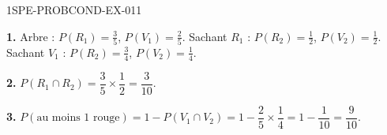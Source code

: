 \begin{corrige}{1SPE-PROBCOND-EX-011}

\textbf{1.} Arbre : $P(R_1) = \frac{3}{5}$, $P(V_1) = \frac{2}{5}$. Sachant $R_1$ : $P(R_2) = \frac{1}{2}$, $P(V_2) = \frac{1}{2}$. Sachant $V_1$ : $P(R_2) = \frac{3}{4}$, $P(V_2) = \frac{1}{4}$.

\medskip
\textbf{2.} $P(R_1 \cap R_2) = \dfrac{3}{5} \times \dfrac{1}{2} = \dfrac{3}{10}$.

\medskip
\textbf{3.} $P(\text{au moins 1 rouge}) = 1 - P(V_1 \cap V_2) = 1 - \dfrac{2}{5} \times \dfrac{1}{4} = 1 - \dfrac{1}{10} = \dfrac{9}{10}$.

\end{corrige}
